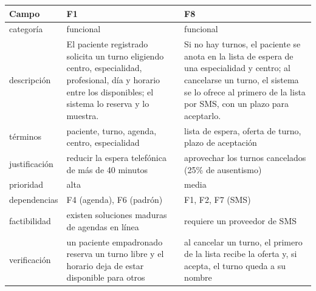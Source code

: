 \documentclass[11pt,a4paper]{article}
\begin{document}
\begin{center}\small
\begin{tabularx}{\textwidth}{@{}l X X@{}}
\toprule
Campo & F1 & F8\\
\midrule
categoría & funcional & funcional\\
descripción & El paciente registrado solicita un turno eligiendo centro, especialidad, profesional, día y
horario entre los disponibles; el sistema lo reserva y lo muestra. & Si no hay turnos, el paciente se anota en
la lista de espera de una especialidad y centro; al cancelarse un turno, el sistema se lo ofrece al primero de
la lista por SMS, con un plazo para aceptarlo.\\
términos & paciente, turno, agenda, centro, especialidad & lista de espera, oferta de turno, plazo de aceptación\\
justificación & reducir la espera telefónica de más de 40 minutos & aprovechar los turnos cancelados (25\% de
ausentismo)\\
prioridad & alta & media\\
dependencias & F4 (agenda), F6 (padrón) & F1, F2, F7 (SMS)\\
factibilidad & existen soluciones maduras de agendas en línea & requiere un proveedor de SMS\\
verificación & un paciente empadronado reserva un turno libre y el horario deja de estar disponible para otros &
al cancelar un turno, el primero de la lista recibe la oferta y, si acepta, el turno queda a su nombre\\
\bottomrule
\end{tabularx}
\end{center}
\end{document}
